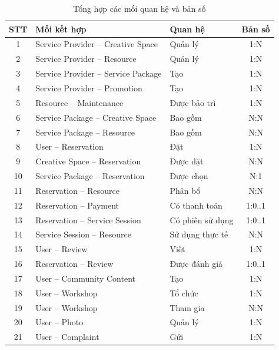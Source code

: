 \begin{table}[htbp]
\centering
\begin{tabular}{|c|l|l|c|}
\hline
\textbf{STT} & \textbf{Mối kết hợp} & \textbf{Quan hệ} & \textbf{Bản số} \\
\hline
1  & Service Provider -- Creative Space  & Quản lý          & 1:N    \\
\hline
2  & Service Provider -- Resource        & Quản lý          & 1:N    \\
\hline
3  & Service Provider -- Service Package & Tạo              & 1:N    \\
\hline
4  & Service Provider -- Promotion       & Tạo              & 1:N    \\
\hline
5  & Resource -- Maintenance             & Được bảo trì     & 1:N    \\
\hline
6  & Service Package -- Creative Space   & Bao gồm          & N:N    \\
\hline
7  & Service Package -- Resource         & Bao gồm          & N:N    \\
\hline
8  & User -- Reservation                 & Đặt              & 1:N    \\
\hline
9  & Creative Space -- Reservation       & Được đặt         & N:N    \\
\hline
10 & Service Package -- Reservation      & Được chọn        & N:1    \\
\hline
11 & Reservation -- Resource             & Phân bổ          & N:N    \\
\hline
12 & Reservation -- Payment              & Có thanh toán    & 1:0..1 \\
\hline
13 & Reservation -- Service Session      & Có phiên sử dụng & 1:0..1 \\
\hline
14 & Service Session -- Resource         & Sử dụng thực tế  & N:N    \\
\hline
15 & User -- Review                      & Viết             & 1:N    \\
\hline
16 & Reservation -- Review               & Được đánh giá    & 1:0..1 \\
\hline
17 & User -- Community Content           & Tạo              & 1:N    \\
\hline
18 & User -- Workshop                    & Tổ chức          & 1:N    \\
\hline
19 & User -- Workshop                    & Tham gia         & N:N    \\
\hline
20 & User -- Photo                       & Quản lý          & 1:N    \\
\hline
21 & User -- Complaint                   & Gửi              & 1:N    \\
\hline
\end{tabular}
\caption{Tổng hợp các mối quan hệ và bản số}
\end{table}

